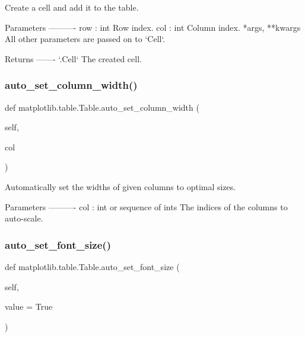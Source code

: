 \begin{DoxyVerb}Create a cell and add it to the table.

Parameters
----------
row : int
    Row index.
col : int
    Column index.
*args, **kwargs
    All other parameters are passed on to `Cell`.

Returns
-------
`.Cell`
    The created cell.\end{DoxyVerb}
 \mbox{\label{classmatplotlib_1_1table_1_1Table_a2b5f5358579cf39869ceac03b4b0fd81}} 
\subsubsection{\texorpdfstring{auto\+\_\+set\+\_\+column\+\_\+width()}{auto\_set\_column\_width()}}
{\footnotesize\ttfamily def matplotlib.\+table.\+Table.\+auto\+\_\+set\+\_\+column\+\_\+width (\begin{DoxyParamCaption}\item[{}]{self,  }\item[{}]{col }\end{DoxyParamCaption})}

\begin{DoxyVerb}Automatically set the widths of given columns to optimal sizes.

Parameters
----------
col : int or sequence of ints
    The indices of the columns to auto-scale.
\end{DoxyVerb}
 \mbox{\label{classmatplotlib_1_1table_1_1Table_a0fc7a804b56aed93aaed1514da6fa0c7}} 
\subsubsection{\texorpdfstring{auto\+\_\+set\+\_\+font\+\_\+size()}{auto\_set\_font\_size()}}
{\footnotesize\ttfamily def matplotlib.\+table.\+Table.\+auto\+\_\+set\+\_\+font\+\_\+size (\begin{DoxyParamCaption}\item[{}]{self,  }\item[{}]{value = {\ttfamily True} }\end{DoxyParamCaption})}

